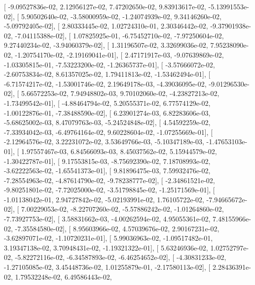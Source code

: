 \documentclass{article}
\begin{document}
       [ -9.09527836e-02,   2.12956127e-02,   7.47202650e-02,
          9.83913617e-02,  -5.13991553e-02],
       [  5.90502640e-02,  -3.58000959e-02,  -1.24074939e-02,
          9.34146260e-02,  -5.09792405e-02],
       [  2.80333445e-02,   1.02724310e-01,   2.30346442e-02,
         -9.37901938e-02,  -7.04115388e-02],
       [  1.07825925e-01,  -6.75452710e-02,  -7.97250604e-02,
          9.27440234e-02,  -3.94060379e-02],
       [  1.31196507e-02,   3.32699036e-02,   7.95238090e-02,
         -1.20754170e-02,  -2.19169041e-01],
       [  2.47171917e-03,  -9.07639869e-02,  -1.03305815e-01,
         -7.53223200e-02,  -1.26365737e-01],
       [ -3.57666072e-02,  -2.60753834e-02,   8.61357025e-02,
          1.79411813e-02,  -1.53462494e-01],
       [ -6.71574217e-02,  -1.53001746e-02,   2.19649178e-03,
         -4.39036095e-02,  -9.01296530e-02],
       [  5.66572253e-02,   7.94948802e-03,   9.70102060e-02,
         -4.23827213e-02,  -1.73499542e-01],
       [ -4.88464794e-02,   5.20555371e-02,   6.77574129e-02,
         -1.00122876e-01,  -7.38488590e-02],
       [  6.23901274e-03,   6.82283606e-03,  -5.68625002e-03,
          8.47079763e-03,  -5.24524848e-02],
       [  4.54592259e-02,  -7.33934042e-03,  -6.49764164e-02,
          9.60228604e-02,  -1.07255669e-01],
       [ -2.12964576e-02,   3.22231072e-02,   3.53649766e-03,
         -5.10347189e-03,  -1.47653103e-01],
       [  1.97557467e-03,   6.84566093e-03,   8.45037562e-02,
          5.15944579e-02,  -1.30422787e-01],
       [  9.17553815e-03,  -8.75692390e-02,   7.18708993e-02,
         -3.62222563e-02,  -1.65541373e-01],
       [  9.81896475e-03,   7.59932476e-02,  -7.28554963e-02,
         -4.87614790e-02,  -9.78238777e-02],
       [ -2.34861521e-02,  -9.80251801e-02,  -7.72025000e-02,
         -3.51798845e-02,  -1.25171569e-01],
       [ -1.01138042e-01,   2.94727842e-02,  -5.02193991e-02,
          1.76105722e-02,  -7.94665672e-02],
       [  7.00229053e-02,  -8.22707260e-02,  -5.57886242e-02,
         -1.01264860e-02,  -7.73927753e-02],
       [  3.58831662e-03,  -4.00262594e-02,   4.95055361e-02,
          7.48155966e-02,  -7.35584580e-02],
       [  8.95603966e-02,   4.57039676e-02,   2.90167231e-02,
         -3.62897071e-02,  -1.10720231e-01],
       [  5.99036963e-02,  -1.09517482e-01,   3.19347138e-02,
          3.70948431e-02,  -1.19321322e-01],
       [  5.63246936e-02,   1.02752797e-02,  -5.82272116e-02,
         -6.34587893e-02,  -6.46254652e-02],
       [ -4.30831233e-02,  -1.27105085e-02,   3.45448736e-02,
          1.01255879e-01,  -2.17580113e-02],
       [  2.28436391e-02,   1.79532248e-02,   6.49586443e-02,
\end{document}
